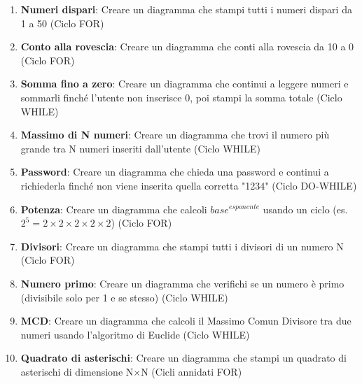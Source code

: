 \documentclass[a4paper,16pt]{article}
\begin{document}
\begin{enumerate}[leftmargin=*]
    \item \textbf{Numeri dispari}: Creare un diagramma che stampi tutti i numeri dispari da 1 a 50 (Ciclo FOR)
    
    \item \textbf{Conto alla rovescia}: Creare un diagramma che conti alla rovescia da 10 a 0 (Ciclo FOR)
    
    \item \textbf{Somma fino a zero}: Creare un diagramma che continui a leggere numeri e sommarli finché l'utente non inserisce 0, poi stampi la somma totale (Ciclo WHILE)
    
    \item \textbf{Massimo di N numeri}: Creare un diagramma che trovi il numero più grande tra N numeri inseriti dall'utente (Ciclo WHILE)
    
    \item \textbf{Password}: Creare un diagramma che chieda una password e continui a richiederla finché non viene inserita quella corretta "1234" (Ciclo DO-WHILE)
    
    \item \textbf{Potenza}: Creare un diagramma che calcoli $base^{esponente}$ usando un ciclo (es. $2^5 = 2 \times 2 \times 2 \times 2 \times 2$) (Ciclo FOR)
    
    \item \textbf{Divisori}: Creare un diagramma che stampi tutti i divisori di un numero N (Ciclo FOR)
    
    \item \textbf{Numero primo}: Creare un diagramma che verifichi se un numero è primo (divisibile solo per 1 e se stesso) (Ciclo WHILE)
    
    \item \textbf{MCD}: Creare un diagramma che calcoli il Massimo Comun Divisore tra due numeri usando l'algoritmo di Euclide (Ciclo WHILE)
    
    \item \textbf{Quadrato di asterischi}: Creare un diagramma che stampi un quadrato di asterischi di dimensione N×N (Cicli annidati FOR)
\end{enumerate}
\end{document}
